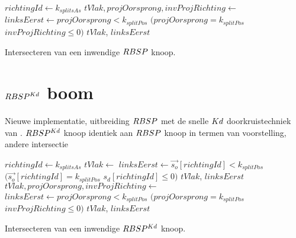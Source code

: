 \begin{dutchalgorithm}
    \begin{algorithmic}       
            \State $richtingId \gets k_{splitsAs}$
            \State $tVlak, projOorsprong, invProjRichting \gets $ 
            \State $linksEerst \gets projOorsprong < k_{splitPos}$ \Or $(projOorsprong = k_{splitPos}$ \And $invProjRichting \leq 0)$
            \State \Return $tVlak$, $linksEerst$
        \EndFunction
    \end{algorithmic}
    \caption{Intersecteren van een inwendige $RBSP$ knoop.}
\end{dutchalgorithm}

\section{$RBSP^{Kd}$ boom}
\label{sec:h4-rbspkd}
Nieuwe implementatie, uitbreiding $RBSP$ met de snelle $Kd$ doorkruistechniek van \authorIze{}.
$RBSP^{Kd}$ knoop identiek aan $RBSP$ knoop in termen van voorstelling, andere intersectie

\begin{dutchalgorithm}
    \begin{algorithmic}       
            \State $richtingId \gets k_{splitsAs}$
                \State $tVlak \gets $ 
                \State $linksEerst \gets \vec{s_o}[richtingId] < k_{splitPos}$ \Or $(\vec{s_o}[richtingId] = k_{splitPos}$ \And $s_d[richtingId] \leq 0)$
                \State \Return $tVlak$, $linksEerst$
            \Else
                \State $tVlak, projOorsprong, invProjRichting \gets $ 
                 \State $linksEerst \gets projOorsprong < k_{splitPos}$ \Or $(projOorsprong = k_{splitPos}$ \And $invProjRichting \leq 0)$
                \State \Return $tVlak$, $linksEerst$
            \EndIf
        \EndFunction
    \end{algorithmic}
    \caption{Intersecteren van een inwendige $RBSP^{Kd}$ knoop.}
\end{dutchalgorithm}

